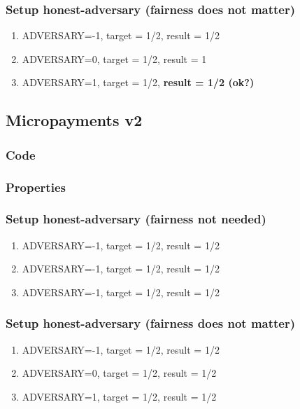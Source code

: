 \documentclass{article}
\begin{document}
\subsubsection{Setup honest-adversary (fairness does not matter)}

\begin{enumerate}
\item ADVERSARY=-1, target = 1/2, result = 1/2
\item ADVERSARY=0, target = 1/2, result = 1
\item ADVERSARY=1, target = 1/2, \textbf{result = 1/2 (ok?)}
\end{enumerate}

\subsection{Micropayments v2}

\subsubsection{Code}



\subsubsection{Properties}




\subsubsection{Setup honest-adversary (fairness not needed)}

\begin{enumerate}
\item ADVERSARY=-1, target = 1/2, result = 1/2
\item ADVERSARY=-1, target = 1/2, result = 1/2
\item ADVERSARY=-1, target = 1/2, result = 1/2
\end{enumerate}

\subsubsection{Setup honest-adversary (fairness does not matter)}

\begin{enumerate}
\item ADVERSARY=-1, target = 1/2, result = 1/2
\item ADVERSARY=0, target = 1/2, result = 1/2
\item ADVERSARY=1, target = 1/2, result = 1/2
\end{enumerate}
\end{document}

